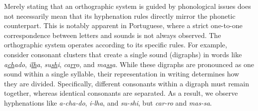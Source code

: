 Merely stating that an orthographic system is guided by phonological issues
does not necessarily mean that its hyphenation rules directly mirror the
phonetic counterpart. This is notably apparent in Portuguese, where a strict
one-to-one correspondence between letters and sounds is not always observed.
The orthographic system operates according to its specific rules. For example,
consider consonant clusters that create a single sound (digraphs) in words like
\emph{a\underline{ch}ado},
\emph{i\underline{lh}a}, 
\emph{su\underline{sh}i},
\emph{ca\underline{rr}o}, and \emph{ma\underline{ss}a}.
While these digraphs are pronounced as one sound within a single syllable,
their representation in writing determines how they are divided. Specifically,
different consonants within a digraph must remain together, whereas identical
consonants are separated. As a result, we observe hyphenations like
\emph{a-cha-do},
\emph{i-lha}, and 
\emph{su-shi},
but \emph{car-ro} and \emph{mas-sa}. 


